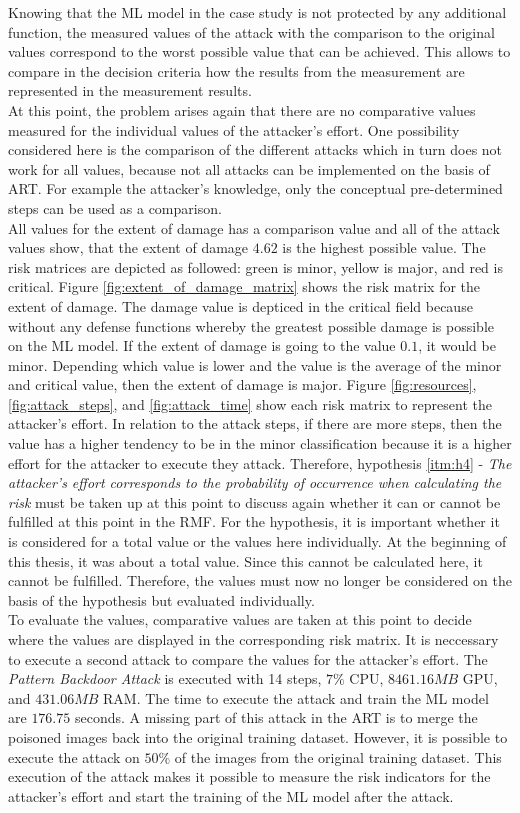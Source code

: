 Knowing that the ML model in the case study is not protected by any additional function, the measured values of the attack with the comparison to the original values correspond to the worst possible value that can be achieved. This allows to compare in the decision criteria how the results from the measurement are represented in the measurement results. \\
At this point, the problem arises again that there are no comparative values measured for the individual values of the attacker's effort. One possibility considered here is the comparison of the different attacks which in turn does not work for all values, because not all attacks can be implemented on the basis of ART. For example the attacker's knowledge, only the conceptual pre-determined steps can be used as a comparison. \\
All values for the extent of damage has a comparison value and all of the attack values show, that the extent of damage $4.62$ is the highest possible value.
The risk matrices are depicted as followed: green is minor, yellow is major, and red is critical.
Figure \ref{fig:extent_of_damage_matrix} shows the risk matrix for the extent of damage. The damage value is depticed in the critical field because without any defense functions whereby the greatest possible damage is possible on the ML model. If the extent of damage is going to the value $0.1$, it would be minor. Depending which value is lower and the value is the average of the minor and critical value, then the extent of damage is major. Figure \ref{fig:resources}, \ref{fig:attack_steps}, and \ref{fig:attack_time} show each risk matrix to represent the attacker's effort. In relation to the attack steps, if there are more steps, then the value has a higher tendency to be in the minor classification because it is a higher effort for the attacker to execute they attack. Therefore,
hypothesis \ref{itm:h4} - \textit{The attacker's effort corresponds to the probability of occurrence when calculating the risk} must be taken up at this point to discuss again whether it can or cannot be fulfilled at this point in the RMF. For the hypothesis, it is important whether it is considered for a total value or the values here individually. At the beginning of this thesis, it was about a total value. Since this cannot be calculated here, it cannot be fulfilled. Therefore, the values must now no longer be considered on the basis of the hypothesis but evaluated individually. \\
To evaluate the values, comparative values are taken at this point to decide where the values are displayed in the corresponding risk matrix. It is neccessary to execute a second attack to compare the values for the attacker's effort. The \textit{Pattern Backdoor Attack} is executed with 14 steps, $7\%$ CPU, $8461.16MB$ GPU, and $431.06MB$ RAM. The time to execute the attack and train the ML model are $176.75$ seconds. A missing part of this attack in the ART is to merge the poisoned images back into the original training dataset. However, it is possible to execute the attack on $50\%$ of the images from the original training dataset. This execution of the attack makes it possible to measure the risk indicators for the attacker's effort and start the training of the ML model after the attack.

